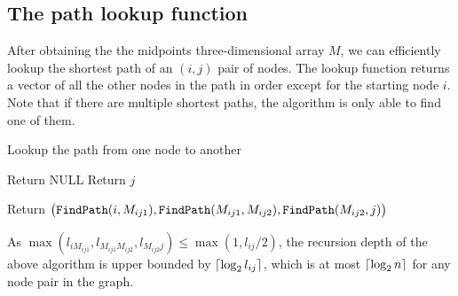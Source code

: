 \documentclass{article} %
\DeclarePairedDelimiter\ceil{\lceil}{\rceil}
\begin{document}
\subsection{The path lookup function} \label{sec:correctness}
After obtaining the the midpoints three-dimensional array $M$, we can efficiently lookup the shortest path 
of an $(i, j)$ pair of nodes. The lookup function returns a vector of all the other nodes in the path in order except for the starting node $i$. Note that if there are multiple shortest paths, the algorithm is only able to find 
one of them.

\begin{algorithm}[H]
\caption{Lookup the path from one node to another}
\begin{algorithmic}
  \State Return NULL
 \EndIf
  \State Return $j$
 \EndIf
  
  Return $\big({\tt FindPath}(i, M_{ij1}), {\tt FindPath}(M_{ij1}, M_{ij2}), {\tt FindPath}(M_{ij2}, j)\big)$
\EndFunction
\end{algorithmic}
\end{algorithm}

As $\max(l_{iM_{ij1}}, l_{M_{ij1}M_{ij2}}, l_{M_{ij2}j}) \leq \max(1, l_{ij}/2)$, the recursion depth of the above
 algorithm is upper bounded by $\ceil{\log_2 l_{ij}}$, which is at most $\ceil{\log_2 n}$ for any node pair in the graph.
\end{document}
